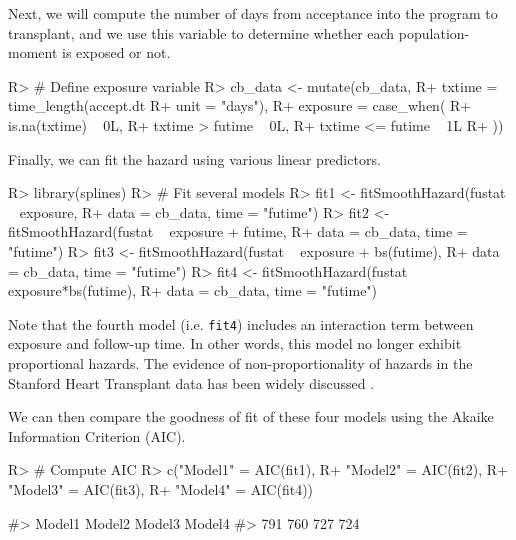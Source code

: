 \documentclass[
]{jss}
\begin{document}
Next, we will compute the number of days from acceptance into the
program to transplant, and we use this variable to determine whether
each population-moment is exposed or not.

\begin{CodeChunk}

\begin{CodeInput}
R> # Define exposure variable
R> cb_data <- mutate(cb_data,
R+                   txtime = time_length(accept.dt %
R+                                        unit = "days"),
R+                   exposure = case_when(
R+                     is.na(txtime) ~ 0L,
R+                     txtime > futime ~ 0L,
R+                     txtime <= futime ~ 1L
R+                   ))
\end{CodeInput}
\end{CodeChunk}

Finally, we can fit the hazard using various linear predictors.

\begin{CodeChunk}

\begin{CodeInput}
R> library(splines)
R> # Fit several models
R> fit1 <- fitSmoothHazard(fustat ~ exposure,
R+                         data = cb_data, time = "futime")
R> fit2 <- fitSmoothHazard(fustat ~ exposure + futime,
R+                         data = cb_data, time = "futime")
R> fit3 <- fitSmoothHazard(fustat ~ exposure + bs(futime),
R+                         data = cb_data, time = "futime")
R> fit4 <- fitSmoothHazard(fustat ~ exposure*bs(futime),
R+                         data = cb_data, time = "futime")
\end{CodeInput}
\end{CodeChunk}

Note that the fourth model (i.e. \texttt{fit4}) includes an interaction
term between exposure and follow-up time. In other words, this model no
longer exhibit proportional hazards. The evidence of non-proportionality
of hazards in the Stanford Heart Transplant data has been widely
discussed \citep{arjas1988graphical}.

We can then compare the goodness of fit of these four models using the
Akaike Information Criterion (AIC).

\begin{CodeChunk}

\begin{CodeInput}
R> # Compute AIC
R> c("Model1" = AIC(fit1),
R+   "Model2" = AIC(fit2),
R+   "Model3" = AIC(fit3),
R+   "Model4" = AIC(fit4))
\end{CodeInput}

\begin{CodeOutput}
#> Model1 Model2 Model3 Model4 
#>    791    760    727    724
\end{CodeOutput}
\end{CodeChunk}
\end{document}
